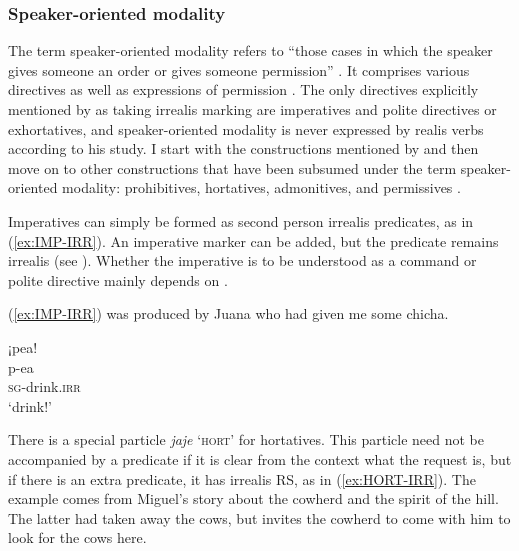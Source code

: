 \subsubsection{Speaker-oriented modality}\label{Par:Speaker_oriented_modality}
The term speaker-oriented modality refers to “those cases in which the speaker gives someone an order or gives someone permission” \citep[31]{deHaan2005}. It comprises various directives as well as expressions of permission \citep[179]{Bybee_et_al1994}. The only directives explicitly mentioned by \citet[252]{Michael2014} as taking irrealis marking are imperatives and polite directives or exhortatives, and speaker-oriented modality is never expressed by realis verbs according to his study.
I start with the constructions mentioned by \citet[252]{Michael2014} and then move on to other constructions that have been subsumed under the term speaker-oriented modality: prohibitives, hortatives, admonitives, and permissives \citep[cf.][179]{Bybee_et_al1994}.

Imperatives can simply be formed as second person irrealis predicates, as in (\ref{ex:IMP-IRR}). An imperative marker can be added, but the predicate remains irrealis (see ). Whether the imperative is to be understood as a command or polite directive mainly depends on .

(\ref{ex:IMP-IRR}) was produced by Juana who had given me some chicha.

\ea\label{ex:IMP-IRR}
\begingl 
\glpreamble ¡pea!\\
\gla p-ea\\ 
\textsc{sg}-drink.\textsc{irr}\\ 
\glft ‘drink!’\\ 
\endgl
 \trailingcitation{[jxx-e120516l-1.044]}
\xe
{}

There is a special particle \textit{jaje} ‘\textsc{hort}’ for hortatives. This particle need not be accompanied by a predicate if it is clear from the context what the request is, but if there is an extra predicate, it has irrealis RS, as in (\ref{ex:HORT-IRR}). The example comes from Miguel’s story about the cowherd and the spirit of the hill. The latter had taken away the cows, but invites the cowherd to come with him to look for the cows here.

